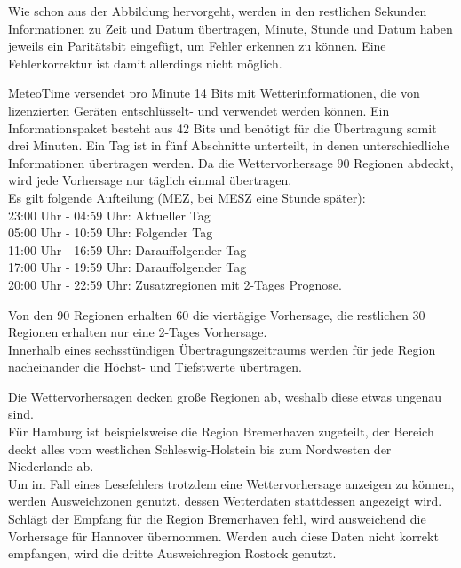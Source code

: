 \documentclass[a4paper,11pt]{article}
\newcounter{subsubsubsection}[subsubsection]
\begin{document}
\vspace{0.2cm}
\noindent
Wie schon aus der Abbildung hervorgeht, werden in den restlichen Sekunden Informationen zu Zeit und Datum übertragen, Minute, Stunde und Datum haben jeweils ein
Paritätsbit eingefügt, um Fehler erkennen zu können. Eine Fehlerkorrektur ist damit allerdings nicht möglich. 

\label{subsubsubsub:meteotime}

MeteoTime versendet pro Minute 14 Bits mit Wetterinformationen, die von lizenzierten Geräten entschlüsselt- und verwendet werden können. 
Ein Informationspaket besteht aus 42 Bits und benötigt für die Übertragung somit drei Minuten. Ein Tag ist in fünf Abschnitte unterteilt, in denen
unterschiedliche Informationen übertragen werden. Da die Wettervorhersage 90 Regionen abdeckt, wird jede Vorhersage nur täglich einmal übertragen. \\
Es gilt folgende Aufteilung (MEZ, bei MESZ eine Stunde später): \\
23:00 Uhr - 04:59 Uhr: Aktueller Tag \\
05:00 Uhr - 10:59 Uhr: Folgender Tag \\
11:00 Uhr - 16:59 Uhr: Darauffolgender Tag \\
17:00 Uhr - 19:59 Uhr: Darauffolgender Tag \\
20:00 Uhr - 22:59 Uhr: Zusatzregionen mit 2-Tages Prognose. 

\vspace{0.2cm}
\noindent
Von den 90 Regionen erhalten 60 die viertägige Vorhersage, die restlichen 30 Regionen erhalten nur eine 2-Tages Vorhersage. \\
Innerhalb eines sechsstündigen Übertragungszeitraums werden für jede Region nacheinander die Höchst- und Tiefstwerte übertragen.

\noindent
Die Wettervorhersagen decken große Regionen ab, weshalb diese etwas ungenau sind. \\
Für Hamburg ist beispielsweise die Region Bremerhaven zugeteilt, der Bereich deckt alles vom westlichen Schleswig-Holstein bis zum Nordwesten der Niederlande ab. \\
Um im Fall eines Lesefehlers trotzdem eine Wettervorhersage anzeigen zu können, werden Ausweichzonen genutzt, dessen Wetterdaten stattdessen angezeigt wird. Schlägt
der Empfang für die Region Bremerhaven fehl, wird ausweichend die Vorhersage für Hannover übernommen. Werden auch diese Daten nicht korrekt empfangen, wird die dritte
Ausweichregion Rostock genutzt. 
\end{document}
